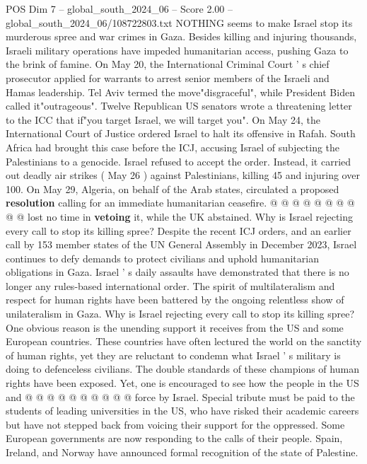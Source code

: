 \begin{textsample}{POS Dim 7 – global\_south\_2024\_06 – Score 2.00 – global\_south\_2024\_06/108722803.txt}  \label{ex:f7_pos_088}
NOTHING seems to make Israel stop its murderous spree and war crimes in Gaza.
Besides killing and injuring thousands, Israeli military operations have impeded humanitarian access, pushing Gaza to the brink of famine.
On May 20, the International Criminal Court ' s chief prosecutor applied for warrants to arrest senior members of the Israeli and Hamas leadership.
Tel Aviv termed the move"disgraceful", while President Biden called it"outrageous".
Twelve Republican US senators wrote a threatening letter to the ICC that if"you target Israel, we will target you".
On May 24, the International Court of Justice ordered Israel to halt its offensive in Rafah.
South Africa had brought this case before the ICJ, accusing Israel of subjecting the Palestinians to a genocide.
Israel refused to accept the order.
Instead, it carried out deadly air strikes ( May 26 ) against Palestinians, killing 45 and injuring over 100.
On May 29, Algeria, on behalf of the Arab states, circulated a proposed \textbf{resolution} calling for an immediate humanitarian ceasefire. @ @ @ @ @ @ @ @ @ @ lost no time in \textbf{vetoing} it, while the UK abstained.
Why is Israel rejecting every call to stop its killing spree?
Despite the recent ICJ orders, and an earlier call by 153 member states of the UN General Assembly in December 2023, Israel continues to defy demands to protect civilians and uphold humanitarian obligations in Gaza.
Israel ' s daily assaults have demonstrated that there is no longer any rules-based international order.
The spirit of multilateralism and respect for human rights have been battered by the ongoing relentless show of unilateralism in Gaza.
Why is Israel rejecting every call to stop its killing spree?
One obvious reason is the unending support it receives from the US and some European countries.
These countries have often lectured the world on the sanctity of human rights, yet they are reluctant to condemn what Israel ' s military is doing to defenceless civilians.
The double standards of these champions of human rights have been exposed.
Yet, one is encouraged to see how the people in the US and @ @ @ @ @ @ @ @ @ @ force by Israel.
Special tribute must be paid to the students of leading universities in the US, who have risked their academic careers but have not stepped back from voicing their support for the oppressed.
Some European governments are now responding to the calls of their people.
Spain, Ireland, and Norway have announced formal recognition of the state of Palestine.

\end{textsample}
